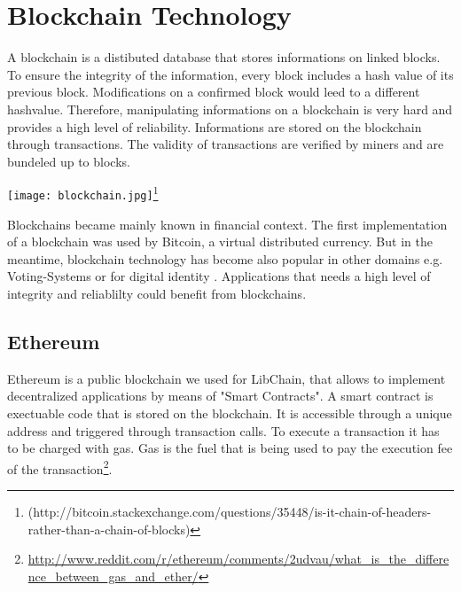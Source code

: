 \chapter{Blockchain Technology\label{cha:chapter1}}

A blockchain is a distibuted database that stores informations on linked blocks. To ensure the integrity of the information, every block includes a hash value of its previous block. Modifications on a confirmed block would leed to a different hashvalue. Therefore, manipulating informations on a blockchain is very hard and provides a high level of reliability.
Informations are stored on the blockchain through transactions. The validity of transactions are verified by miners and are bundeled up to blocks.

\vspace{0.3cm}
\texttt{[image: blockchain.jpg]}\footnote{(http://bitcoin.stackexchange.com/questions/35448/is-it-chain-of-headers-rather-than-a-chain-of-blocks)}

Blockchains became mainly known in financial context. The first implementation of a blockchain was used by Bitcoin, a virtual distributed currency.
But in the meantime, blockchain technology has become also popular in other domains e.g. Voting-Systems  or for digital identity . Applications that needs a high level of integrity and reliablilty could benefit from blockchains.




\section{Ethereum}
Ethereum is a public blockchain we used for LibChain, that allows to implement decentralized applications by means of "Smart Contracts". A smart contract is exectuable code that is stored on the blockchain. It is accessible through a unique address and triggered through transaction calls.
To execute a transaction it has to be charged with gas. Gas is the fuel that is being used to pay the execution fee of the transaction\footnote{\url{http://www.reddit.com/r/ethereum/comments/2udvau/what_is_the_difference_between_gas_and_ether/}}.


